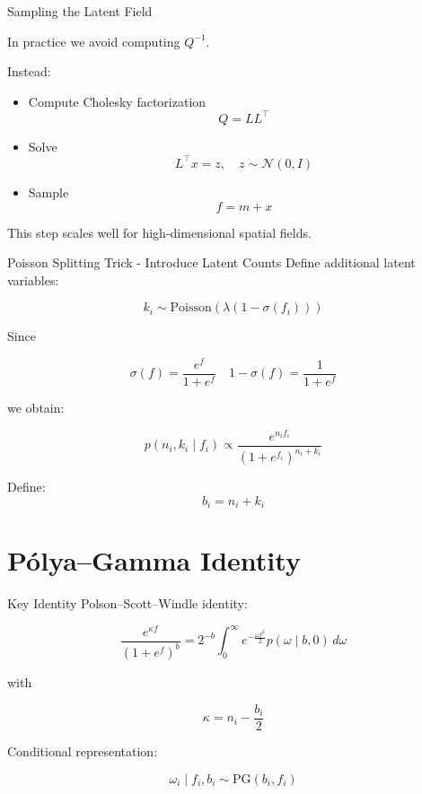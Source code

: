 \documentclass[11pt]{beamer}
\begin{document}
\begin{frame}{Sampling the Latent Field}

In practice we avoid computing $Q^{-1}$.

Instead:

\begin{itemize}
\item Compute Cholesky factorization
\[
Q = LL^\top
\]

\item Solve
\[
L^\top x = z, \quad z\sim \mathcal{N}(0,I)
\]

\item Sample
\[
f = m + x
\]
\end{itemize}

This step scales well for high-dimensional
spatial fields.

\end{frame}



\begin{frame}{Poisson Splitting Trick - Introduce Latent Counts}
Define additional latent variables:

\[
k_i \sim \text{Poisson}(\lambda(1-\sigma(f_i)))
\]

Since

\[
\sigma(f) = \frac{e^f}{1+e^f}
\quad
1-\sigma(f)=\frac{1}{1+e^f}
\]

we obtain:

\[
p(n_i,k_i \mid f_i)
\propto
\frac{e^{n_i f_i}}{(1+e^{f_i})^{n_i+k_i}}
\]

Define:
\[
b_i = n_i + k_i
\]
\end{frame}


\section{Pólya--Gamma Identity}

\begin{frame}{Key Identity}
Polson–Scott–Windle identity:

\[
\frac{e^{\kappa f}}{(1+e^f)^b}
=
2^{-b}
\int_0^\infty
e^{-\frac{\omega f^2}{2}}
p(\omega \mid b,0)
\, d\omega
\]

with

\[
\kappa = n_i - \frac{b_i}{2}
\]

Conditional representation:

\[
\omega_i \mid f_i,b_i
\sim
\text{PG}(b_i,f_i)
\]
\end{frame}
\end{document}
